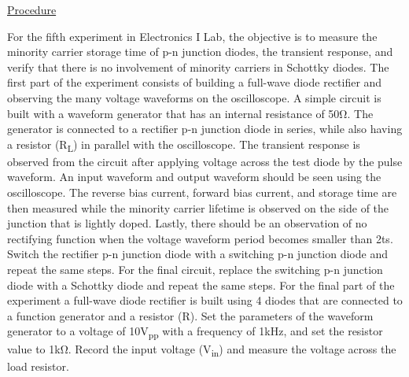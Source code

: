 \underline{Procedure}

For the fifth experiment in Electronics I Lab, the objective is to measure the minority carrier storage time of p-n junction diodes, the transient response, and verify that there is no involvement of minority carriers in Schottky diodes. The first part of the experiment consists of building a full-wave diode rectifier and observing the many voltage waveforms on the oscilloscope. A simple circuit is built with a waveform generator that has an internal resistance of 50\si{\ohm}. The generator is connected to a rectifier p-n junction diode in series, while also having a resistor (R\textsubscript{L}) in parallel with the oscilloscope. The transient response is observed from the circuit after applying voltage across the test diode by the pulse waveform. An input waveform and output waveform should be seen using the oscilloscope. The reverse bias current, forward bias current, and storage time are then measured while the minority carrier lifetime is observed on the side of the junction that is lightly doped. Lastly, there should be an observation of no rectifying function when the voltage waveform period becomes smaller than 2ts. Switch the rectifier p-n junction diode with a switching p-n junction diode and repeat the same steps. For the final circuit, replace the switching p-n junction diode with a Schottky diode and repeat the same steps. For the final part of the experiment a full-wave diode rectifier is built using 4 diodes that are connected to a function generator and a resistor (R). Set the parameters of the waveform generator to a voltage of 10V\textsubscript{pp} with a frequency of 1kHz, and set the resistor value to 1k\si{\ohm}. Record the input voltage (V\textsubscript{in}) and measure the voltage across the load resistor. \\

